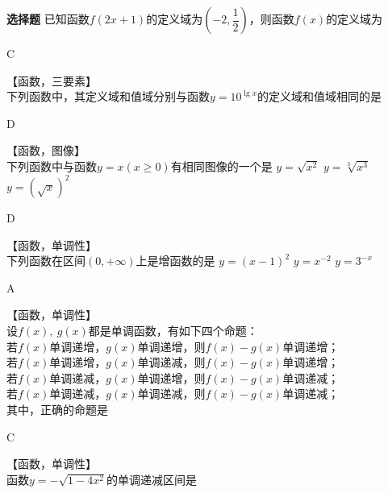 \begin{exercise}{\bf 选择题}
      已知函数$f(2x+1)$的定义域为$\left(-2,\dfrac{1}{2}\right)$，则函数$f(x)$的定义域为\xz
      \begin{answer}
        C
      \end{answer}
    \item 【函数，三要素】\\
      下列函数中，其定义域和值域分别与函数$y=10^{\lg x}$的定义域和值域相同的是\xz
      \begin{answer}
        D
      \end{answer}
    \item 【函数，图像】\\
      下列函数中与函数$y=x(x\geq 0)$有相同图像的一个是\xz
        {$y=\sqrt{x^2}$}
        {$y=\sqrt[3]{x^3}$}
        {$y=( \sqrt x)^2 $}
      \begin{answer}
        D
      \end{answer}
    \item 【函数，单调性】\\
      下列函数在区间$(0,+\infty) $上是增函数的是\xz
         {$y=(x-1)^2$}
         {$y=x^{-2}$}
         {$y=3^{-x}$}
      \begin{answer}
        A
      \end{answer}
    \item 【函数，单调性】\\
      设$f(x),\ g(x)$都是单调函数，有如下四个命题：\\
      若$f(x)$单调递增，$g(x)$单调递增，则$f(x)-g(x)$单调递增；\\
      若$f(x)$单调递增，$g(x)$单调递减，则$f(x)-g(x)$单调递增；\\
      若$f(x)$单调递减，$g(x)$单调递增，则$f(x)-g(x)$单调递减；\\
      若$f(x)$单调递减，$g(x)$单调递减，则$f(x)-g(x)$单调递减；\\
      其中，正确的命题是\xz
      \begin{answer}
        C
      \end{answer}
    \item 【函数，单调性】\\
      函数$y=-\sqrt{1-4x^2}$的单调递减区间是\xz

\end{exercise}
